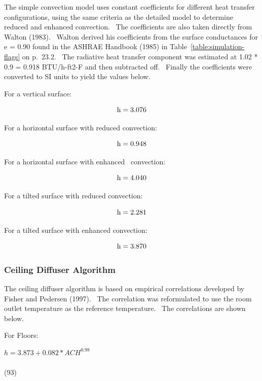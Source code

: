 The simple convection model uses constant coefficients for different heat transfer configurations, using the same criteria as the detailed model to determine reduced and enhanced convection.~ The coefficients are also taken directly from Walton (1983).~ Walton derived his coefficients from the surface conductances for e = 0.90 found in the ASHRAE Handbook (1985) in Table~\ref{table:simulation-flags} on p.~23.2.~ The radiative heat transfer component was estimated at 1.02 * 0.9 = 0.918 BTU/h-ft2-F and then subtracted off.~ Finally the coefficients were converted to SI units to yield the values below.

For a vertical surface:

\begin{equation}
{\rm{h  =  3}}{\rm{.076}}
\end{equation}

For a horizontal surface with reduced convection:

\begin{equation}
{\rm{h  =  0}}{\rm{.948}}
\end{equation}

For a horizontal surface with enhanced~ convection:

\begin{equation}
{\rm{h  =  4}}{\rm{.040}}
\end{equation}

For a tilted surface with reduced convection:

\begin{equation}
{\rm{h  =  2}}{\rm{.281}}
\end{equation}

For a tilted surface with enhanced convection:

\begin{equation}
{\rm{h  =  3}}{\rm{.870}}
\end{equation}

\subsubsection{Ceiling Diffuser Algorithm}\label{ceiling-diffuser-algorithm}

The ceiling diffuser algorithm is based on empirical correlations developed by Fisher and Pedersen (1997).~ The correlation was reformulated to use the room outlet temperature as the reference temperature.~ The correlations are shown below.

For Floors:

\(h = 3.873 + 0.082 * AC{H^{0.98}}\) ~~~~~~~~~~~~~~~~~~~~~~~~~~~~~~~~~~~~~~~~~~~~~~~~~~~~~~~~~~~~~~~~~~~~~ (93)

